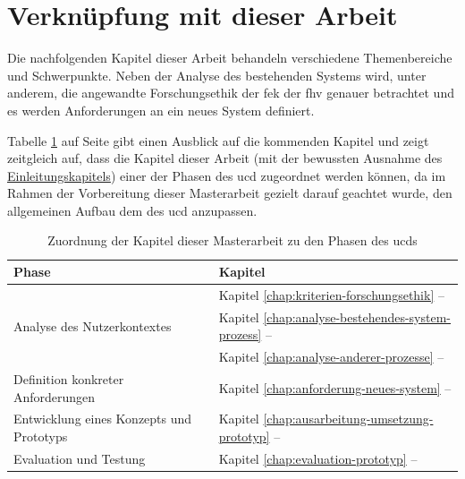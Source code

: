 \documentclass[a4paper,12pt,twoside,numbers=noendperiod]{scrreprt}
\begin{document}
\section{Verknüpfung mit dieser Arbeit}
\label{sec:ucd-verknüpfung-arbeit}

Die nachfolgenden Kapitel dieser Arbeit behandeln verschiedene Themenbereiche und Schwerpunkte. Neben der Analyse des bestehenden Systems wird, unter anderem, die angewandte Forschungsethik der \acl{fek} der \acl{fhv} genauer betrachtet und es werden Anforderungen an ein neues System definiert.

Tabelle \ref{tab:zurordnung-kapitel-ucd} auf Seite \pageref{tab:zurordnung-kapitel-ucd} gibt einen Ausblick auf die kommenden Kapitel und zeigt zeitgleich auf, dass die Kapitel dieser Arbeit (mit der bewussten Ausnahme des \hyperref[chap:einleitung]{Einleitungskapitels}) einer der Phasen des \acl{ucd} zugeordnet werden können, da im Rahmen der Vorbereitung dieser Masterarbeit gezielt darauf geachtet wurde, den allgemeinen Aufbau dem des \ac{ucd} anzupassen.

\begin{table}[ht]
    \centering
    \begin{tabular}{p{.35\linewidth} | p{.55\linewidth}}
        \textbf{Phase} & \textbf{Kapitel} \\ \hline
        \multirow{3}{\linewidth}{Analyse des Nutzerkontextes} & Kapitel \ref{chap:kriterien-forschungsethik} -- \nameref{chap:kriterien-forschungsethik} \\ \cline{2-2} 
         & Kapitel \ref{chap:analyse-bestehendes-system-prozess} -- \nameref{chap:analyse-bestehendes-system-prozess} \\ \cline{2-2} 
         & Kapitel \ref{chap:analyse-anderer-prozesse} -- \nameref{chap:analyse-anderer-prozesse} \\ \hline
        Definition konkreter Anforderungen & Kapitel \ref{chap:anforderung-neues-system} -- \nameref{chap:anforderung-neues-system} \\ \hline
        Entwicklung eines Konzepts und Prototyps & Kapitel \ref{chap:ausarbeitung-umsetzung-prototyp} -- \nameref{chap:ausarbeitung-umsetzung-prototyp} \\ \hline
        Evaluation und Testung & Kapitel \ref{chap:evaluation-prototyp} -- \nameref{chap:evaluation-prototyp}
    \end{tabular}
    \caption{Zuordnung der Kapitel dieser Masterarbeit zu den Phasen des \acl{ucd}s}
    \label{tab:zurordnung-kapitel-ucd}
\end{table}
\end{document}
